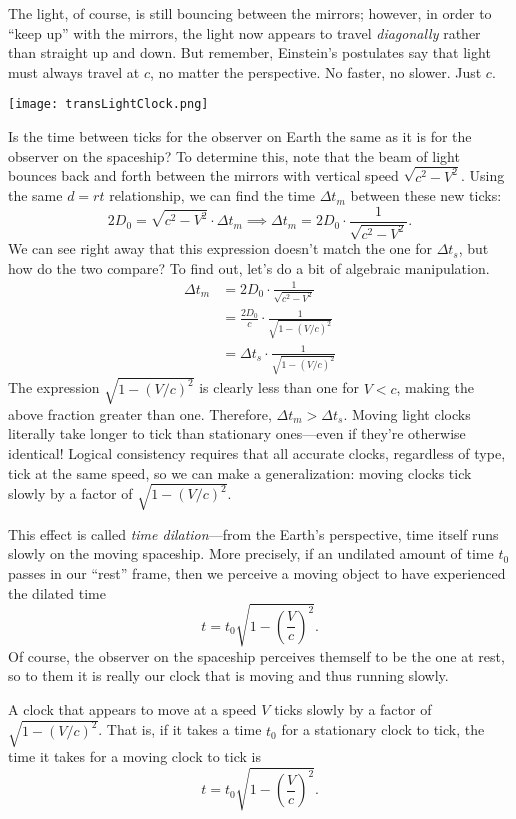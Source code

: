 \documentclass[../p023main.tex]{subfiles}
\begin{document}
The light, of course, is still bouncing between the mirrors; however, in order to ``keep up'' with the mirrors, the light now appears to travel \textit{diagonally} rather than straight up and down.
But remember, Einstein's postulates say that light must always travel at $c$, no matter the perspective.
No faster, no slower.
Just $c$.
\begin{center}
    \texttt{[image: transLightClock.png]}
\end{center}
Is the time between ticks for the observer on Earth the same as it is for the observer on the spaceship?
To determine this, note that the beam of light bounces back and forth between the mirrors with vertical speed $\sqrt{c^2 - V^2}$.
Using the same $d = rt$ relationship, we can find the time $\Delta t_m$ between these new ticks:
\[ 2D_0 = \sqrt{c^2 - V^2} \cdot \Delta t_m \implies \Delta t_m = 2D_0 \cdot \frac{1}{\sqrt{c^2 - V^2}}. \]
We can see right away that this expression doesn't match the one for $\Delta t_s$, but how do the two compare?
To find out, let's do a bit of algebraic manipulation.
\begin{align*}
    \Delta t_m &= 2D_0 \cdot \frac{1}{\sqrt{c^2 - V^2}} \\
    &= \frac{2D_0}{c} \cdot \frac{1}{\sqrt{1 - \left( V / c \right)^2}} \\
    &= \Delta t_s \cdot \frac{1}{\sqrt{1 - \left( V / c \right)^2}}
\end{align*}
The expression $\sqrt{1 - \left( V / c \right)^2}$ is clearly less than one for $V < c$, making the above fraction greater than one.
Therefore, $\Delta t_m > \Delta t_s$.
Moving light clocks literally take longer to tick than stationary ones---even if they're otherwise identical!
Logical consistency requires that all accurate clocks, regardless of type, tick at the same speed, so we can make a generalization: moving clocks tick slowly by a factor of $\sqrt{1 - \left( V / c \right)^2}$.

This effect is called \textit{time dilation}---from the Earth's perspective, time itself runs slowly on the moving spaceship.
More precisely, if an undilated amount of time $t_0$ passes in our ``rest'' frame, then we perceive a moving object to have experienced the dilated time
\[ t = t_0 \sqrt{1 - \left( \frac{V}{c} \right)^2}. \]
Of course, the observer on the spaceship perceives themself to be the one at rest, so to them it is really our clock that is moving and thus running slowly.

\begin{summary}
    A clock that appears to move at a speed $V$ ticks slowly by a factor of $\sqrt{1 - \left( V / c \right)^2}$.
    That is, if it takes a time $t_0$ for a stationary clock to tick, the time it takes for a moving clock to tick is
    \[ t = t_0 \sqrt{1 - \left( \frac{V}{c} \right)^2}. \]
\end{summary}
\end{document}
